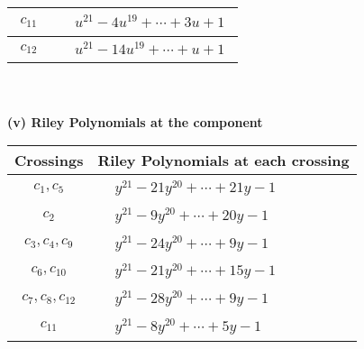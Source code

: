 \documentclass[1p]{elsarticle_modified}
\theoremstyle{definition}
\begin{document}
\begin{tabular}{m{50pt}|m{274pt}}
\hline $$\begin{aligned}c_{11}\end{aligned}$$&$\begin{aligned}
&u^{21}-4 u^{19}+\cdots+3 u+1
\end{aligned}$\\
\hline $$\begin{aligned}c_{12}\end{aligned}$$&$\begin{aligned}
&u^{21}-14 u^{19}+\cdots+u+1
\end{aligned}$\\
\hline
\end{tabular}\\~\\
\newpage\renewcommand{\arraystretch}{1}
\flushleft \textbf{(v) Riley Polynomials at the component}\newline \\
\begin{tabular}{m{50pt}|m{274pt}}
Crossings & \hspace{64pt}Riley Polynomials at each crossing \\
\hline $$\begin{aligned}c_{1},c_{5}\end{aligned}$$&$\begin{aligned}
&y^{21}-21 y^{20}+\cdots+21 y-1
\end{aligned}$\\
\hline $$\begin{aligned}c_{2}\end{aligned}$$&$\begin{aligned}
&y^{21}-9 y^{20}+\cdots+20 y-1
\end{aligned}$\\
\hline $$\begin{aligned}c_{3},c_{4},c_{9}\end{aligned}$$&$\begin{aligned}
&y^{21}-24 y^{20}+\cdots+9 y-1
\end{aligned}$\\
\hline $$\begin{aligned}c_{6},c_{10}\end{aligned}$$&$\begin{aligned}
&y^{21}-21 y^{20}+\cdots+15 y-1
\end{aligned}$\\
\hline $$\begin{aligned}c_{7},c_{8},c_{12}\end{aligned}$$&$\begin{aligned}
&y^{21}-28 y^{20}+\cdots+9 y-1
\end{aligned}$\\
\hline $$\begin{aligned}c_{11}\end{aligned}$$&$\begin{aligned}
&y^{21}-8 y^{20}+\cdots+5 y-1
\end{aligned}$\\
\hline
\end{tabular}\\~\\
\end{document}
